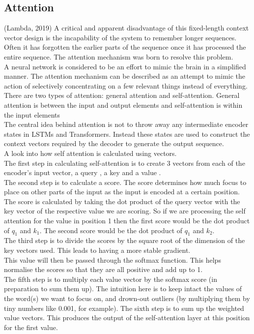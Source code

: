 \documentclass{article}
\begin{document}
\subsection{Attention}
(Lambda, 2019)
A critical and apparent disadvantage of this fixed-length context vector design is the incapability
of the system to remember longer sequences. Often it has forgotten the earlier parts of the
sequence once it has processed the entire sequence. The attention mechanism was born to resolve
this problem.\\
A neural network is considered to be an effort to mimic the brain in a simplified manner. The
attention mechanism can be described as an attempt to mimic the action of selectively
concentrating on a few relevant things instead of everything. There are two types of attention:
general attention and self-attention. General attention is between the input and output elements
and self-attention is within the input elements\\
The central idea behind attention is not to throw away any intermediate encoder states in LSTMs
and Transformers. Instead these states are used to construct the context vectors required by the
decoder to generate the output sequence.\\
A look into how self attention is calculated using vectors.\\
The first step in calculating self-attention is to create 3 vectors from each of the encoder’s input
vector, a query , a key  and a value .\\
The second step is to calculate a score. The score determines how much focus to place on other
parts of the input as the input is encoded at a certain position.\\
The score is calculated by taking the dot product of the query vector with the key vector of the
respective value we are scoring. So if we are processing the self attention for the value in position
1 then the first score would be the dot product of $q_1$ and $k_1$. The second score would be the dot
product of $q_1$ and $k_2$.\\
The third step is to divide the scores by the square root of the dimension of the key vectors used.
This leads to having a more stable gradient.\\
This value will then be passed through the softmax function. This helps normalise the scores so
that they are all positive and add up to 1.\\
The fifth step is to multiply each value vector by the softmax score (in preparation to sum them
up). The intuition here is to keep intact the values of the word(s) we want to focus on, and
drown-out outliers (by multiplying them by tiny numbers like 0.001, for example).
The sixth step is to sum up the weighted value vectors. This produces the output of the
self-attention layer at this position for the first value.
\clearpage
\end{document}
